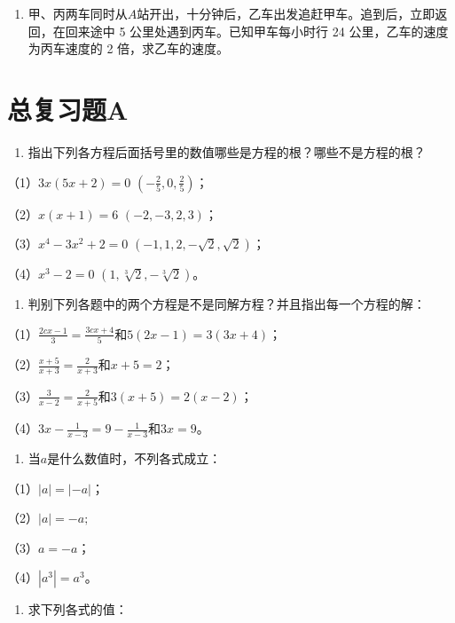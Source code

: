 \begin{enumerate}[start=10]
\item
  甲、丙两车同时从\(A\)站开出，十分钟后，乙车出发追赶甲车。追到后，立即返回，在回来途中
  5 公里处遇到丙车。已知甲车每小时行 24 公里，乙车的速度为丙车速度的 2
  倍，求乙车的速度。
\end{enumerate}

\chapter{总复习题A}

\begin{enumerate}
\item
  指出下列各方程后面括号里的数值哪些是方程的根？哪些不是方程的根？
\end{enumerate}

（1）\(3x(5x + 2) = 0\) \(\left(-\frac{2}{5}, 0, \frac{2}{5}\right)\)；

（2）\(x(x + 1) = 6\) \((-2, -3, 2, 3)\)；

（3）\(x^{4} - 3x^{2} + 2 = 0\) \((-1, 1, 2, -\sqrt{2}, \sqrt{2})\)；

（4）\(x^{3} - 2 = 0\) \((1, \sqrt[3]{2}, -\sqrt[3]{2})\)。

\begin{enumerate}[start=2]
\item
  判别下列各题中的两个方程是不是同解方程？并且指出每一个方程的解：
\end{enumerate}

（1）\(\frac{2cx - 1}{3} = \frac{3cx + 4}{5}\)和\(5(2x - 1) = 3(3x + 4)\)；

（2）\(\frac{x + 5}{x + 3} = \frac{2}{x + 3}\)和\(x + 5 = 2\)；

（3）\(\frac{3}{x - 2} = \frac{2}{x + 5}\)和\(3(x + 5) = 2(x - 2)\)；

（4）\(3x - \frac{1}{x - 3} = 9 - \frac{1}{x - 3}\)和\(3x = 9\)。

\begin{enumerate}[start=3]
\item
  当\(a\)是什么数值时，不列各式成立：
\end{enumerate}

（1）\(|a| = |-a|\)；

（2）\(|a| = -a;\)

（3）\(a = -a\)；

（4）\(|a^{3}| = a^{3}\)。

\begin{enumerate}[start=4]
\item
  求下列各式的值：
\end{enumerate}

